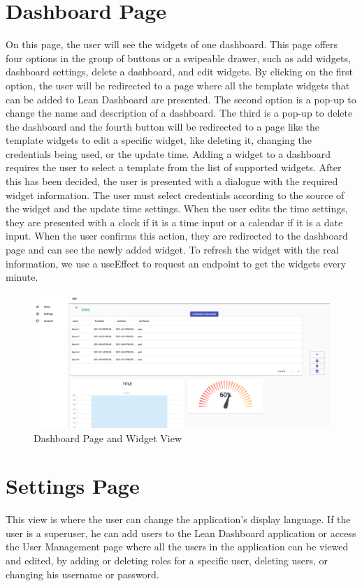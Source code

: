 \documentclass[a4paper,twoside,10pt]{report}
\begin{document}
\newpage
\section{Dashboard Page}
On this page, the user will see the widgets of one dashboard. This page offers four options in the group of buttons or a swipeable drawer, such as add widgets, dashboard settings, delete a dashboard, and edit widgets.
By clicking on the first option, the user will be redirected to a page where all the template widgets that can be added to Lean Dashboard are presented.
The second option is a pop-up to change the name and description of a dashboard.
The third is a pop-up to delete the dashboard and the fourth button will be redirected to a page like the template widgets to edit a specific widget, like deleting it, changing the credentials being used, or the update time.
\newline
Adding a widget to a dashboard requires the user to select a template from the list of supported widgets. After this has been decided, the user is presented with a dialogue with the required widget information. The user must select credentials according to the source of the widget and the update time settings. When the user edits the time settings, they are presented with a clock if it is a time input or a calendar if it is a date input. When the user confirms this action, they are redirected to the dashboard page and can see the newly added widget. To refresh the widget with the real information, we use a useEffect to request an endpoint to get the widgets every minute.

\begin{figure}[h!]
\center
  \includegraphics[width=\textwidth]{dashboardPage.png}
\caption{Dashboard Page and Widget View}
\end{figure}

\section{Settings Page}
This view is where the user can change the application's display language. If the user is a superuser, he can add users to the Lean Dashboard application or access the User Management page where all the users in the application can be viewed and edited, by adding or deleting roles for a specific user, deleting users, or changing his username or password. 
\end{document}
